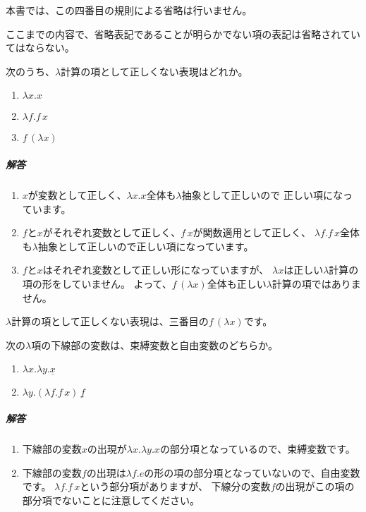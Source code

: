 本書では、この四番目の規則による省略は行いません。

\begin{note}
ここまでの内容で、省略表記であることが明らかでない項の表記は省略されていてはならない。
\end{note}

\begin{exercise}

次のうち、$\lambda$計算の項として正しくない表現はどれか。

\begin{enumerate}
  \item$\lambda x . x$
  \item$\lambda f . f \, x$
  \item$f \, (\lambda x)$
\end{enumerate}

\subparagraph{解答}

\begin{enumerate}
  \item$x$が変数として正しく、$\lambda x . x$全体も$\lambda$抽象として正しいので
        正しい項になっています。
  \item$f$と$x$がそれぞれ変数として正しく、$f \, x$が関数適用として正しく、
       $\lambda f . f \, x$全体も$\lambda$抽象として正しいので正しい項になっています。
  \item$f$と$x$はそれぞれ変数として正しい形になっていますが、
       $\lambda x$は正しい$\lambda$計算の項の形をしていません。
        よって、$f \, (\lambda x)$全体も正しい$\lambda$計算の項ではありません。
\end{enumerate}

$\lambda$計算の項として正しくない表現は、三番目の$f \, (\lambda x)$です。

\end{exercise}

\begin{exercise}

次の$\lambda$項の下線部の変数は、束縛変数と自由変数のどちらか。

\begin{enumerate}
  \item$\lambda x . \lambda y . \underline{x}$
  \item$\lambda y . (\lambda f . f \, x) \, \underline{f}$
\end{enumerate}

\subparagraph{解答}

\begin{enumerate}
  \item 下線部の変数$x$の出現が$\lambda x . \lambda y . x$の部分項となっているので、束縛変数です。
  \item 下線部の変数$f$の出現は$\lambda f . e$の形の項の部分項となっていないので、自由変数です。
       $\lambda f . f \, x$という部分項がありますが、
        下線分の変数$f$の出現がこの項の部分項でないことに注意してください。
\end{enumerate}

\end{exercise}

